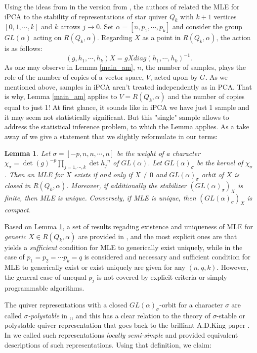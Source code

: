 \documentclass[reqno]{amsart}
\theoremstyle{plain}
\newtheorem{lemma}[theorem]{Lemma}
\theoremstyle{definition}
\theoremstyle{remark}
\begin{document}
Using the ideas from \cite{am} in the version from \cite{dm}, the authors of \cite{fm} related the MLE for iPCA to the stability of representations of star quiver $Q_k$ with $k+1$ vertices $[0,1,\cdots,k]$ and $k$ arrows $j\to 0$.  Set $\alpha=[n,p_1,\cdots,p_k]$ and consider the group $GL(\alpha)$ acting on  $R(Q_k,\alpha)$. Regarding $X$  as a point in $R(Q_k,\alpha)$, the action is as follows:
\begin{equation}
(g,h_1,\cdots,h_k)X= g X diag(h_1,\cdots,h_k)^{-1}.
\end{equation}
As one may observe in Lemma \ref{main_am}, $n$, the number of samples, plays the role of the number of copies of a vector space, $V$, acted upon by $G$. As we mentioned above, samples in iPCA aren't treated independently as in PCA. That is why, Lemma \ref{main_am} applies to $V=R(Q_k,\alpha)$ and the number of copies equal to just 1! At first glance, it sounds  like in iPCA we have just 1 sample and it may seem not  statistically significant. But this "single" sample allows to address the statistical inference problem, to which the Lemma applies. As a take away of \cite{fm} we give a statement that we slightly reformulate in our terms:

\begin{lemma}\label{fm-equiv} \cite[2.6]{fm}
Let $\sigma=[-p,n,n,\cdots,n]$ be the weight of a character $\chi_{\sigma}=\det(g)^{-p}\prod_{j=1,\cdots,k}\det{h_j}^n$ of $GL(\alpha)$. Let $GL(\alpha)_{\sigma}$ be the kernel of $\chi_{\sigma}$. Then an MLE for $X$ exists if and only if $X\neq 0$ and $GL(\alpha)_{\sigma}$ orbit of $X$ is closed in $R(Q_k,\alpha)$. Moreover, if additionally the stabilizer $(GL(\alpha)_{\sigma})_X$ is finite, then MLE is unique.   Conversely, if MLE is unique, then $(GL(\alpha)_{\sigma})_X$ is compact.
\end{lemma}

Based on Lemma \ref{fm-equiv}, a set of results regading existence and uniqueness of MLE for {\it generic} $X\in R(Q_k,\alpha)$ are provided in \cite{fm}, and the most explicit ones are \cite[Theorem~1.1]{fm} that yields a {\it sufficient} condition for MLE to generically exist uniquely, while in \cite[Theorem~1.2]{fm} the case of $p_1=p_2=\cdots p_k=q$ is considered and necessary and sufficient condition for MLE to generically exist or exist uniquely are given for any $(n,q,k)$. However, the general case of unequal $p_j$ is not covered by explicit criteria or simply programmable algorithms.

The quiver representations with a closed $GL(\alpha)_{\sigma}$-orbit for a character $\sigma$ are called {\it $\sigma$-polystable} in \cite{am},\cite{dm},\cite{fm} and this has a clear relation to the theory of $\sigma$-stable or polystable quiver representation that goes back to the brilliant A.D.King paper \cite{k}.  In \cite{sh07} we called such representations
{\it locally semi-simple} and provided  equivalent descriptions of such representations.
Using that definition, we claim:
\end{document}
